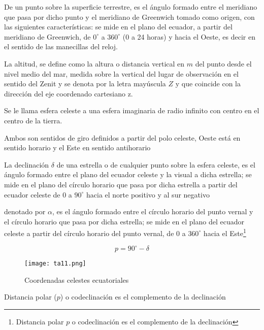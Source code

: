 \begin{definition}[Longitud]
    De un punto sobre la superficie terrestre, es el ángulo formado entre el meridiano que pasa por dicho punto y el meridiano de Greenwich tomado como origen, con las siguientes características: se mide en el plano del ecuador, a partir del meridiano de Greenwich, de $0^{\circ}$ a $360^{\circ}$ (0 a 24 horas) y hacia el Oeste, es decir en el sentido de las manecillas del reloj.
\end{definition}

La altitud, se define como la altura o distancia vertical en $m$ del punto desde el nivel medio del mar, medida sobre la vertical del lugar de observación en el sentido del Zenit y se denota por la letra mayúscula $Z$ y que coincide con la dirección del eje coordenado cartesiano z.

Se le llama esfera celeste a una esfera imaginaria de radio infinito con centro en el centro de la tierra.

Ambos son sentidos de giro definidos a partir del polo celeste, Oeste está en sentido horario y el Este en sentido antihorario

\begin{definition}[Declinación]
    La declinación $\delta$ de una estrella o de cualquier punto sobre la esfera celeste, es el ángulo formado entre el plano del ecuador celeste y la visual a dicha estrella; se mide en el plano del círculo horario que pasa por dicha estrella a partir del ecuador celeste de 0 a $90^{\circ}$ 
    hacia el norte positivo y al sur negativo
\end{definition}
\begin{definition}
    denotado por $\alpha$, es el ángulo formado entre el círculo horario del punto vernal y el círculo horario que pasa por dicha estrella; se mide en el plano del ecuador celeste a partir del círculo horario del punto vernal, de 0 a $360^{\circ}$ hacia el Este\footnote{Distancia polar $p$ o codeclinación es el complemento de la declinación}
\end{definition}
\begin{equation}
    p=90^{\circ}-\delta
\end{equation}

\begin{figure}[h!]
  \centerline{\texttt{[image: ta11.png]}}
  \caption{Coordenadas celestes ecuatoriales}
  \label{ta11}
\end{figure}

Distancia polar ($p$) o codeclinación es el complemento de la declinación

